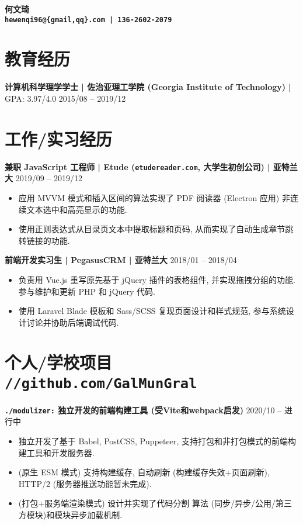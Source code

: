 \documentclass[10 pt]{article}
\begin{document}
\begin{center}
\textbf{\huge 何文琦}\\
\vspace{0.5em}
\textbf{\texttt{hewenqi96@\{gmail,qq\}.com | 136-2602-2079 }}
\end{center}

\section*{教育经历}
\textbf{计算机科学理学学士 | 佐治亚理工学院 (Georgia Institute of Technology)} | GPA: 3.97/4.0 \hfill 2015/08 -- 2019/12

\section*{工作/实习经历}
\textbf{兼职 JavaScript 工程师 | Etude (\texttt{etudereader.com}, 大学生初创公司) | 亚特兰大} \hfill 2019/09 -- 2019/12
\begin{itemize}
\item 应用 MVVM 模式和插入区间的算法实现了 PDF 阅读器 (Electron 应用) 非连续文本选中和高亮显示的功能.
\item 使用正则表达式从目录页文本中提取标题和页码, 从而实现了自动生成章节跳转链接的功能.
\end{itemize}

\textbf{前端开发实习生 | PegasusCRM | 亚特兰大} \hfill 2018/01 -- 2018/04
\begin{itemize}
\item 负责用 Vue.js 重写原先基于 jQuery 插件的表格组件, 并实现拖拽分组的功能. 参与维护和更新 PHP 和 jQuery 代码.
\item 使用 Laravel Blade 模板和 Sass/SCSS 复现页面设计和样式规范, 参与系统设计讨论并协助后端调试代码.
\end{itemize} 

\section*{个人/学校项目 \texttt{\large //github.com/GalMunGral}}
\textbf{ \texttt{./modulizer:} 独立开发的前端构建工具 (受Vite和webpack启发) } \hfill 2020/10 -- 进行中 
\begin{itemize}
\item 独立开发了基于 Babel, PostCSS, Puppeteer, 支持打包和非打包模式的前端构建工具和开发服务器.
\item (原生 ESM 模式) 支持构建缓存, 自动刷新 (构建缓存失效+页面刷新), HTTP/2 (服务器推送功能暂未完成).
\item (打包+服务端渲染模式) 设计并实现了代码分割 算法 (同步/异步/公用/第三方模块)和模块异步加载机制.
\end{itemize}
\end{document}
